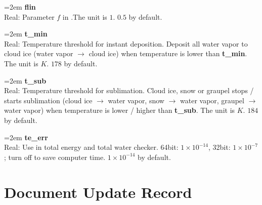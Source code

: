 \documentclass[letterpaper,titlepage,10pt]{article}
\numberwithin{equation}{section}
\begin{document}
\begin{appendices}
\hangindent=2em
\textbf{flin}\\ Real: Parameter $f$ in \citet{lin1983bulk}.The unit is $1$. $0.5$ by default.

\hangindent=2em
\textbf{t\_min}\\ Real: Temperature threshold for instant deposition. Deposit all water vapor to cloud ice (water vapor $\rightarrow$ cloud ice) when temperature is lower than \textbf{t\_min}. The unit is $K$. $178$ by default.

\hangindent=2em
\textbf{t\_sub}\\ Real: Temperature threshold for sublimation. Cloud ice, snow or graupel stops / starts sublimation (cloud ice $\rightarrow$ water vapor, snow $\rightarrow$ water vapor, graupel $\rightarrow$ water vapor) when temperature is lower / higher than \textbf{t\_sub}. The unit is $K$. $184$ by default.

\hangindent=2em
\textbf{te\_err}\\ Real: Use in total energy and total water checker. 64bit: $1 \times 10^{-14}$, 32bit: $1 \times 10^{-7}$; turn off to save computer time. $1 \times 10^{-14}$ by default.


\newpage
\section{Document Update Record}


\end{appendices}
\end{document}
